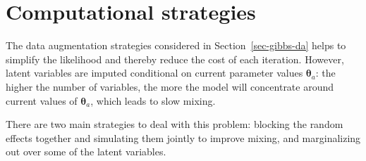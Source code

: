 \documentclass[
  11pt,
  letterpaper,
]{scrbook}
\theoremstyle{plain}
\theoremstyle{plain}
\theoremstyle{plain}
\theoremstyle{definition}
\theoremstyle{definition}
\theoremstyle{definition}
\theoremstyle{remark}
\begin{document}
\section{Computational strategies}\label{computational-strategies}

The data augmentation strategies considered in
Section~\ref{sec-gibbs-da} helps to simplify the likelihood and thereby
reduce the cost of each iteration. However, latent variables are imputed
conditional on current parameter values \(\boldsymbol{\theta}_a\): the
higher the number of variables, the more the model will concentrate
around current values of \(\boldsymbol{\theta}_a\), which leads to slow
mixing.

There are two main strategies to deal with this problem: blocking the
random effects together and simulating them jointly to improve mixing,
and marginalizing out over some of the latent variables.
\end{document}
